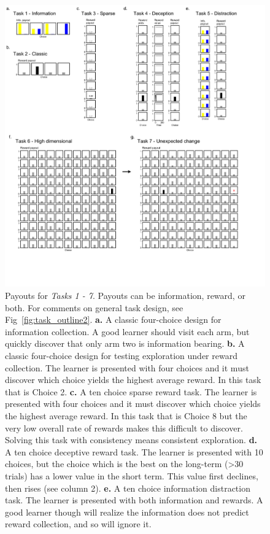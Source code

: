 \begin{figure}
	\begin{fullwidth}
	\includegraphics[width=0.95\linewidth]{img/task_payout.pdf} 
	\caption{Payouts for \textit{Tasks 1 - 7}. Payouts can be information, reward, or both. For comments on general task design, see Fig~\ref{fig:task_outline2}.
	\textbf{a.} A classic four-choice design for information collection. A good learner should visit each arm, but quickly discover that only arm two is information bearing.
	\textbf{b.} A classic four-choice design for testing exploration under reward collection. The learner is presented with four choices and it must discover which choice yields the highest average reward. In this task that is Choice 2. 
	\textbf{c.} A ten choice sparse reward task. The learner is presented with four choices and it must discover which choice yields the highest average reward. In this task that is Choice 8 but the very low overall rate of rewards makes this difficult to discover. Solving this task with consistency means consistent exploration. 
	\textbf{d.} A ten choice deceptive reward task. The learner is presented with 10 choices, but the choice which is the best on the long-term (>30 trials) has a lower value in the short term. This value first declines, then rises (see column 2).
	\textbf{e.} A ten choice information distraction task. The learner is presented with both information and rewards. A good learner though will realize the information does not predict reward collection, and so will ignore it.
}
\end{fullwidth}
\end{figure}
